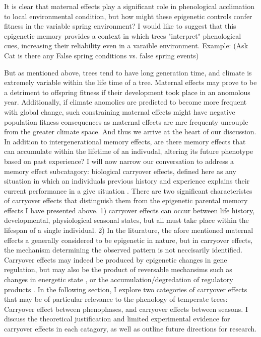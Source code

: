 \documentclass{article}\usepackage[]{graphicx}\usepackage[]{color}
\begin{document}
\par It is clear that maternal effects play a significant role in phenological acclimation to local environmental condition, but how might these epigenetic controls confer fitness in the variable spring environment? I would like to suggest that this epigenetic memory provides a context in which trees "interpret" phenological cues, increasing their reliability even in a varaible environment. Example:
(Ask Cat is there any False spring conditions vs. false spring events)
\par But as mentioned above, trees tend to have long generation time, and climate is extremely variable within the life time of a tree. Maternal effects may prove to be a detriment to offspring fitness if their development took place in an anomolous year. Additionally, if climate anomolies are predicted to become more frequent with global change, such constraining maternal effects might have negative population fitness consequences as maternal effects are mre frequenty uncouple from the greater climate space. And thus we arrive at the heart of our discussion. In addition to intergenerational memory effects, are there memory effects that can accumulate within the lifetime of an indivudal, altering its future phenotype based on past experience? I will now narrow our conversation to address a memory effect subcatagory: biological carryover effects, defined here as any situation in which an individuals previous history and experience explains their current performance in a give situation \citep{O'Connor2014}. There are two significant characteristcs of carryover effects that distinguish them from the epigenetic parental memory effects I have presented above. 1) carryover effects can occur between life history, developmental, physiological seasonal states, but all must take place within the lifespan of a single individual. 2) In the liturature, the afore mentioned maternal effects a generally considered to be epigenetic in nature, but in carryover effects, the mechanism determining the observed pattern is not neccisarily identified. Carryover effects may indeed be produced by epigenetic changes in gene regulation, but may also be the product of reversable mechansims such as changes in energetic state \citep{O'Connor2014}, or the accumulation/degredation of regulatory products \citep{Gomory2015}. In the following section, I explore two categories of carryover effects that may be of particular relevance to the phenology of temperate trees: Carryover effect between phenophases, and carryover effects between seasons. I discuss the theoretical justification and limited experimental evidence for carryover effects in each catagory, as well as outline future directions for research.
\end{document}
